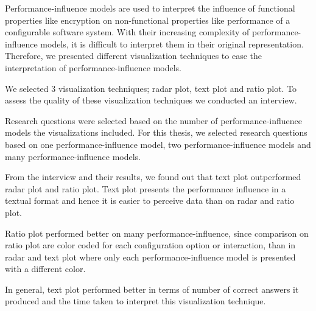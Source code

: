 \label{conclusion}

Performance-influence models are used to interpret the influence of functional properties like encryption on non-functional properties like performance of a configurable software system. With their increasing complexity of performance-influence models, it is difficult to interpret them in their original representation. Therefore, we presented different visualization techniques to ease the interpretation of performance-influence models.

We selected 3 visualization techniques; radar plot, text plot and ratio plot. To assess the quality of these visualization techniques we conducted an interview. 

Research questions were selected based on the number of performance-influence models the visualizations included. For this thesis, we selected research questions based on one performance-influence model, two performance-influence models and many performance-influence models.

From the interview and their results, we found out that text plot outperformed radar plot and ratio plot. Text plot presents the performance influence in a textual format and hence it is easier to perceive data than on radar and ratio plot.

Ratio plot performed better on many performance-influence, since comparison on ratio plot are color coded for each configuration option or interaction, than in radar and text plot where only each performance-influence model is presented with a different color.

In general, text plot performed better in terms of number of correct answers it produced and the time taken to interpret this visualization technique.




